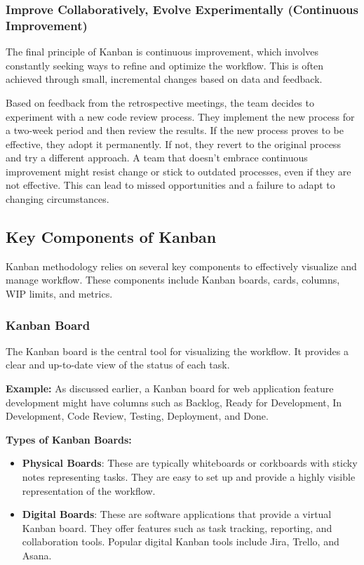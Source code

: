 \subsubsection{Improve Collaboratively, Evolve Experimentally (Continuous Improvement)}

The final principle of Kanban is continuous improvement, which involves
constantly seeking ways to refine and optimize the workflow. This is often
achieved through small, incremental changes based on data and feedback.

\begin{examplecountercard}
  Based on feedback from the retrospective meetings, the team decides to experiment with a new code review process. They implement the new process for a two-week period and then review the results. If the new process proves to be effective, they adopt it permanently. If not, they revert to the original process and try a different approach.
  \tcblower
  A team that doesn't embrace continuous improvement might resist change or stick to outdated processes, even if they are not effective. This can lead to missed opportunities and a failure to adapt to changing circumstances.
\end{examplecountercard}

\subsection{Key Components of Kanban}

Kanban methodology relies on several key components to effectively visualize
and manage workflow. These components include Kanban boards, cards, columns,
WIP limits, and metrics.

\subsubsection{Kanban Board}

The Kanban board is the central tool for visualizing the workflow. It provides
a clear and up-to-date view of the status of each task.

\textbf{Example:} As discussed earlier, a Kanban board for web application feature development might have columns such as Backlog, Ready for Development, In Development, Code Review, Testing, Deployment, and Done.

\textbf{Types of Kanban Boards:}

\begin{itemize}
  \item \textbf{Physical Boards}: These are typically whiteboards or corkboards with sticky notes representing tasks. They are easy to set up and provide a highly visible representation of the workflow.
  \item \textbf{Digital Boards}: These are software applications that provide a virtual Kanban board. They offer features such as task tracking, reporting, and collaboration tools. Popular digital Kanban tools include Jira, Trello, and Asana.
\end{itemize}

